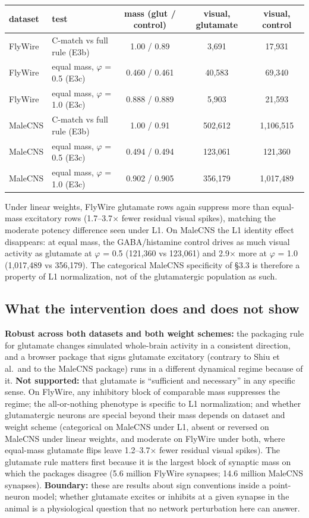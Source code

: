 \documentclass[11pt,a4paper]{article}
\begin{document}
\begin{center}
\footnotesize
\begin{tabular}{llccc}
\toprule
dataset & test & mass (glut / control) & visual, glutamate & visual, control \\
\midrule
FlyWire & C-match vs full rule (E3b) & 1.00 / 0.89 & 3,691 & 17,931 \\
FlyWire & equal mass, $\varphi$ = 0.5 (E3c) & 0.460 / 0.461 & 40,583 & 69,340 \\
FlyWire & equal mass, $\varphi$ = 1.0 (E3c) & 0.888 / 0.889 & 5,903 & 21,593 \\
MaleCNS & C-match vs full rule (E3b) & 1.00 / 0.91 & 502,612 & 1,106,515 \\
MaleCNS & equal mass, $\varphi$ = 0.5 (E3c) & 0.494 / 0.494 & 123,061 & 121,360 \\
MaleCNS & equal mass, $\varphi$ = 1.0 (E3c) & 0.902 / 0.905 & 356,179 & 1,017,489 \\
\bottomrule
\end{tabular}
\end{center}

Under linear weights, FlyWire glutamate rows again suppress more than equal-mass
excitatory rows (1.7--3.7$\times$ fewer residual visual spikes), matching the
moderate potency difference seen under L1. On MaleCNS the L1 identity effect
disappears: at equal mass, the GABA/histamine control drives as much visual
activity as glutamate at $\varphi$ = 0.5 (121,360 vs 123,061) and
2.9$\times$ more at $\varphi$ = 1.0 (1,017,489 vs 356,179). The categorical
MaleCNS specificity of \S3.3 is therefore a property of L1 normalization, not
of the glutamatergic population as such.

\subsection{What the intervention does and does not show}

\textbf{Robust across both datasets and both weight schemes:} the packaging
rule for glutamate changes simulated whole-brain activity in a consistent
direction, and a browser package that signs glutamate excitatory (contrary to
Shiu et al.\ and to the MaleCNS package) runs in a different dynamical regime
because of it. \textbf{Not supported:} that glutamate is ``sufficient and
necessary'' in any specific sense. On FlyWire, any inhibitory block of
comparable mass suppresses the regime; the all-or-nothing phenotype is
specific to L1 normalization; and whether glutamatergic neurons are special
beyond their mass depends on dataset and weight scheme (categorical on MaleCNS
under L1, absent or reversed on MaleCNS under linear weights, and moderate on FlyWire
under both, where equal-mass glutamate flips leave 1.2--3.7$\times$ fewer
residual visual spikes). The glutamate rule matters first because it is
the largest block of synaptic mass on which the packages disagree (5.6 million
FlyWire synapses; 14.6 million MaleCNS synapses). \textbf{Boundary:} these are
results about sign conventions inside a point-neuron model; whether glutamate
excites or inhibits at a given synapse in the animal is a physiological
question that no network perturbation here can answer.
\end{document}
